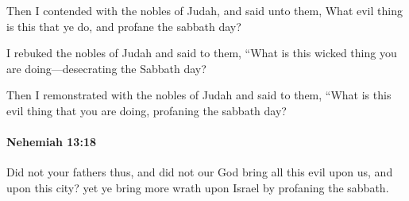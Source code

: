 			\begin{versebox}
					\item[BHS] 
					\item[LXX] 
					\item[ASV] Then I contended with the nobles of Judah, and said unto them, What evil thing is this that ye do, and profane the sabbath day?
					\item[NIV] I rebuked the nobles of Judah and said to them, “What is this wicked thing you are doing—desecrating the Sabbath day?
					\item[NRSV] Then I remonstrated with the nobles of Judah and said to them, “What is this evil thing that you are doing, profaning the sabbath day?
			\end{versebox}

		\paragraph{Nehemiah 13:18} %
			\label{NEHEMIAH-13-18}

			Did not your fathers thus, and did not our God bring all this evil upon us, and upon this city? yet ye bring more wrath upon Israel by profaning the sabbath.


